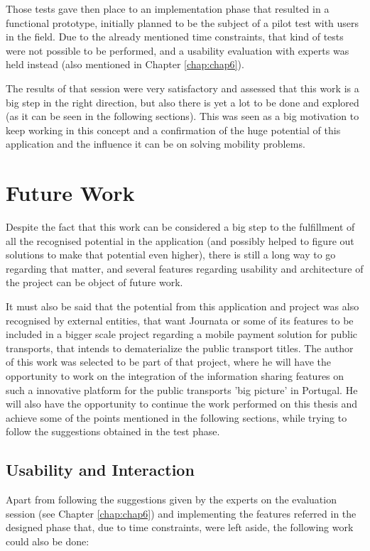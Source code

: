 Those tests gave then place to an implementation phase that resulted in a functional prototype, initially planned to be the subject of a pilot test with users in the field. Due to the already mentioned time constraints, that kind of tests were not possible to be performed, and a usability evaluation with experts was held instead (also mentioned in Chapter \ref{chap:chap6}). 

The results of that session were very satisfactory and assessed that this work is a big step in the right direction, but also there is yet a lot to be done and explored (as it can be seen in the following sections). This was seen as a big motivation to keep working in this concept and a confirmation of the huge potential of this application and the influence it can be on solving mobility problems.

\section{Future Work}

Despite the fact that this work can be considered a big step to the fulfillment of all the recognised potential in the application (and possibly helped to figure out solutions to make that potential even higher), there is still a long way to go regarding that matter, and several features regarding usability and architecture of the project can be object of future work.


It must also be said that the potential from this application and project was also recognised by external entities, that want Journata or some of its features to be included in a bigger scale project regarding a mobile payment solution for public transports, that intends to dematerialize the public transport titles. 
The author of this work was selected to be part of that project, where he will have the opportunity to work on the integration of the information sharing features on such a innovative platform for the public transports 'big picture' in Portugal.
He will also have the opportunity to continue the work performed on this thesis and achieve some of the points mentioned in the following sections, while trying to follow the suggestions obtained in the test phase.

\subsection{Usability and Interaction}

Apart from following the suggestions given by the experts on the evaluation session (see Chapter \ref{chap:chap6}) and implementing the features referred in the designed phase that, due to time constraints, were left aside, the following work could also be done:

